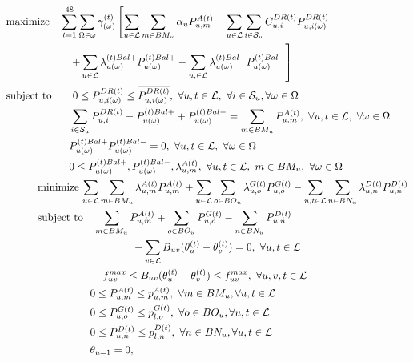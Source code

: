 \documentclass[a4j,10.5pt]{jarticle}
\begin{document}
\begin{align}
&{\rm maximize}\quad \sum_{t=1}^{48} \sum_{\Omega\in \omega}\gamma_{(\omega)}^{(t)}\left[\sum_{u\in \mathcal{L}} \sum_{m\in BM_u}\alpha_u P_{u,m}^{A(t)}-\sum_{u\in \mathcal{L}}\sum_{i\in \mathcal{S}_u}C_{u,i}^{DR(t)}P_{u,i(\omega)}^{DR(t)}\notag \right. \\
&~~~~~~~~~~~~~~~~~~\left.+\sum_{u\in \mathcal{L}}\lambda_{u(\omega)}^{(t)Bal+}P_{u(\omega)}^{(t)Bal+}-\sum_{u,\in \mathcal{L}}\lambda_{u(\omega)}^{(t)Bal-}P_{u(\omega)}^{(t)Bal-}\right]\label{DA1}\\
&{\rm subject\,\,to}\qquad 0\le P_{u,i(\omega)}^{DR(t)}\le \overline{P_{u,i(\omega)}^{DR(t)}},\ \forall u,t\in\mathcal{L},\ \forall i\in\mathcal{S}_u, \forall \omega \in \Omega \label{DA2}\\
&~~~~~~~~~~~~~~~~~~\sum_{i\in \mathcal{S}_u}P_{u,i}^{DR(t)}-P_{u(\omega)}^{(t)Bal+}+P_{u(\omega)}^{(t)Bal-}=\sum_{m\in BM_u}P_{u,m}^{A(t)},\ \forall u,t\in\mathcal{L},\ \forall \omega \in \Omega \label{DA3}\\
&~~~~~~~~~~~~~~~~~~P_{u(\omega)}^{(t)Bal+}P_{u(\omega)}^{(t)Bal-}=0,\ \forall u,t\in\mathcal{L},\ \forall \omega \in \Omega \label{DA4}\\
&~~~~~~~~~~~~~~~~~~0\le P_{u(\omega)}^{(t)Bal+},P_{u(\omega)}^{(t)Bal-},\lambda_{u,m}^{A(t)},\ \forall u,t\in\mathcal{L},\ m\in BM_u,\ \forall \omega \in \Omega\label{DA5}\\
&\quad \quad \quad {\rm minimize}\,\sum_{u\in \mathcal{L}}\sum_{m\in BM_u}\lambda^{A(t)}_{u,m}P^{A(t)}_{u,m}+\sum_{u\in \mathcal{L}}\sum_{o\in BO_u}\lambda^{G(t)}_{u,o}P^{G(t)}_{u,o}-\sum_{u,t\in \mathcal{L}}\sum_{n\in BN_u}\lambda^{D(t)}_{u,n}P^{D(t)}_{u,n}\label{DA6}\\
&\quad \quad \quad {\rm subject\,\,to}\quad \sum_{m\in BM_u}P^{A(t)}_{u,m}+\sum_{o\in BO_u}P^{G(t)}_{u,o}-\sum_{n\in BN_u}P^{D(t)}_{u,n}\notag \\
&\qquad \qquad \qquad  \qquad \qquad \qquad -\sum_{v\in \mathcal{L}}B_{uv}(\theta_u^{(t)}-\theta_v^{(t)})=0,\  \forall u,t \in \mathcal{L}\label{DA7}\\
&\qquad \qquad \qquad  \qquad -f^{max}_{uv} \leq B_{uv}(\theta_{u}^{(t)}-\theta_{v}^{(t)}) \leq f^{max}_{uv},\ \forall u,v,t \in \mathcal{L}\label{DA8}\\
&\qquad \qquad \qquad \qquad  0\leq P^{A(t)}_{u,m} \leq p^{A(t)}_{u,m},\ \forall m\in BM_u, \forall u,t \in \mathcal{L}\label{DA9}\\
&\qquad \qquad \qquad \qquad  0\leq P^{G(t)}_{u,o}\leq p^{G(t)}_{l,o},\ \forall o\in BO_u, \forall u,t \in \mathcal{L}\label{DA10}\\
&\qquad \qquad \qquad \qquad  0\leq P^{D(t)}_{u,n} \leq p^{D(t)}_{l,n},\ \forall n\in BN_u, \forall u,t \in \mathcal{L}\label{DA11}\\
&\qquad \qquad \qquad \qquad  \theta_{u=1}=0,\ \label{DA12}
\end{align}
\end{document}

